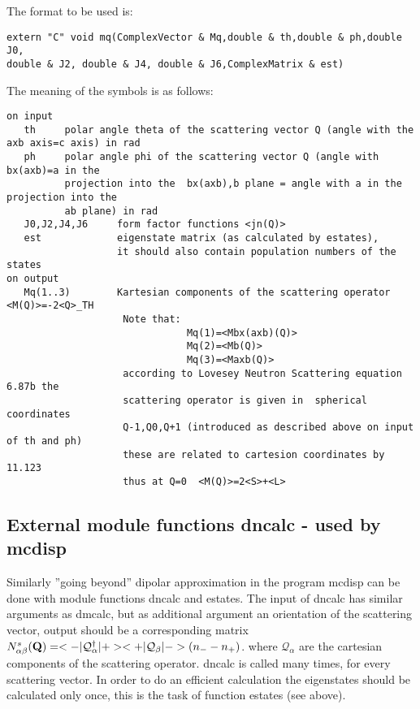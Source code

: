 The format to be used is:
{\footnotesize
\begin{verbatim}
extern "C" void mq(ComplexVector & Mq,double & th,double & ph,double J0,
double & J2, double & J4, double & J6,ComplexMatrix & est)
\end{verbatim}

The meaning of the symbols is as follows:

\begin{verbatim}
on input
   th     polar angle theta of the scattering vector Q (angle with the axb axis=c axis) in rad
   ph     polar angle phi of the scattering vector Q (angle with bx(axb)=a in the 
          projection into the  bx(axb),b plane = angle with a in the projection into the 
		  ab plane) in rad
   J0,J2,J4,J6     form factor functions <jn(Q)>   
   est             eigenstate matrix (as calculated by estates),
                   it should also contain population numbers of the states
on output
   Mq(1..3)        Kartesian components of the scattering operator <M(Q)>=-2<Q>_TH
                    Note that: 
                               Mq(1)=<Mbx(axb)(Q)>
                               Mq(2)=<Mb(Q)>
                               Mq(3)=<Maxb(Q)>
                    according to Lovesey Neutron Scattering equation 6.87b the 
                    scattering operator is given in  spherical coordinates 
					Q-1,Q0,Q+1 (introduced as described above on input of th and ph)
					these are related to cartesion coordinates by 11.123
				    thus at Q=0  <M(Q)>=2<S>+<L>

\end{verbatim}
}

\subsection{External module functions {\prg dncalc} - used by {\prg mcdisp}  }

Similarly  ''going beyond''  dipolar approximation in the program {\prg mcdisp}
can be done with  module functions {\prg dncalc} and {\prg estates}. 
The input of {\prg dncalc} 
has similar arguments as
{\prg dmcalc}, but as additional argument an orientation
of the scattering vector,
output should be a corresponding matrix 
$N^s_{\alpha\beta}(\mathbf Q)=<-|\mathcal Q^{\dag}_{\alpha}|+><+|\mathcal Q_{\beta}|-> (n_--n_+)$.
where $\mathcal Q_{\alpha}$ are the cartesian components of the scattering operator.
 {\prg dncalc} is called many times, for
 every scattering vector. In order to
 do an efficient calculation the eigenstates should be calculated only
 once, this is the task of function {\prg estates} (see above).


